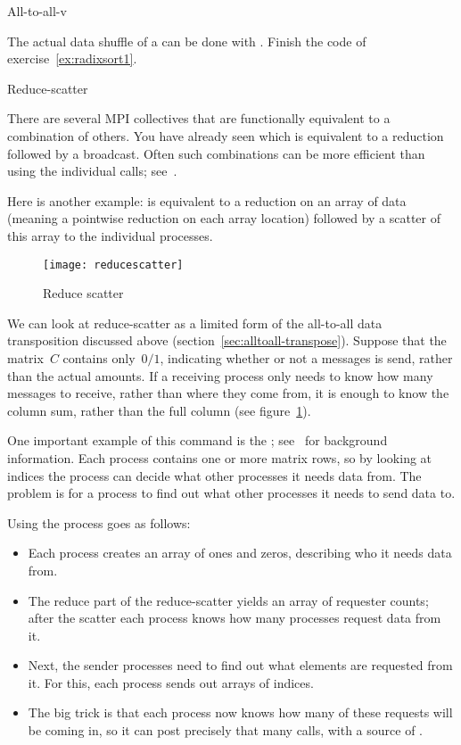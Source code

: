 {All-to-all-v}

\begin{exercise}
  \label{ex:radixsort2}
  The actual data shuffle of a  can be done
  with . Finish the code of
  exercise~\ref{ex:radixsort1}.
\end{exercise}

 {Reduce-scatter}
\label{sec:reducescatter}

There are several MPI collectives that are functionally equivalent to
a combination of others. You have already seen  which
is equivalent to a reduction followed by a broadcast. Often such
combinations can be more efficient than using the individual calls;
see~.

Here is another example:  is equivalent
to a reduction on an array of data (meaning a pointwise reduction on each
array location) followed by a scatter of this array to the individual 
processes.

\begin{figure}[ht]
  \texttt{[image: reducescatter]}
  \caption{Reduce scatter}
  \label{fig:reducescatter}
\end{figure}

We can look at reduce-scatter as a limited form of the all-to-all data
transposition discussed above (section~\ref{sec:alltoall-transpose}).
Suppose that the matrix~$C$ contains only~$0/1$, indicating
whether or not a messages is send, rather than the actual amounts.
If a receiving process only needs to know how many messages to
receive, rather than where they come from, it is enough to know the
column sum, rather than the full column (see figure~\ref{fig:reducescatter}).

One important example of this command is the
;
see~ for background information.
Each process contains one or more matrix rows, so by looking at indices
the process can decide what other processes it needs data from.
The problem is for a process to find out what other processes 
it needs to send data to. 

Using  the process goes as follows:
\begin{itemize}
\item Each process creates an array of ones and zeros, describing who
  it needs data from.
\item The reduce part of the reduce-scatter yields an array of
  requester counts; after the scatter each process knows how many
  processes request data from it.
\item Next, the sender processes need to find out what elements are
  requested from it. For this, each process sends out arrays of
  indices.
\item The big trick is that each process now knows how many of these
  requests will be coming in, so it can post precisely that many
   calls, with a source of .
\end{itemize}

